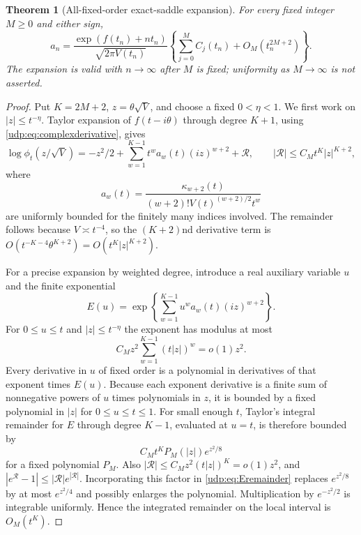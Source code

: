 \documentclass[11pt]{article}
\newtheorem{theorem}{Theorem}[section]
\theoremstyle{remark}\newtheorem{remark}[theorem]{Remark}
\numberwithin{equation}{section}
\begin{document}
\begin{theorem}[All-fixed-order exact-saddle expansion]\label{udp:thm:saddle}
For every fixed integer $M\ge0$ and either sign,
\begin{equation}\label{udp:eq:allsaddle}
 a_n=\frac{\exp(f(t_n)+nt_n)}{\sqrt{2\pi V(t_n)}}
 \left\{\sum_{j=0}^M C_j(t_n)+O_M(t_n^{2M+2})\right\}.
\end{equation}
The expansion is valid with $n\to\infty$ after $M$ is fixed; uniformity as $M\to\infty$ is not asserted.
\end{theorem}
\begin{proof}
Put $K=2M+2$, $z=\theta\sqrt V$, and choose a fixed $0<\eta<1$. We first work on $|z|\le t^{-\eta}$. Taylor expansion of $f(t-i\theta)$ through degree $K+1$, using \eqref{udp:eq:complexderivative}, gives
\begin{equation}\label{udp:eq:localexp}
 \log\phi_t(z/\sqrt V)
 =-z^2/2+\sum_{w=1}^{K-1}t^wa_w(t)(iz)^{w+2}+\mathcal R,
 \qquad |\mathcal R|\le C_Mt^K|z|^{K+2},
\end{equation}
where
\[
 a_w(t)=\frac{\kappa_{w+2}(t)}{(w+2)!V(t)^{(w+2)/2}t^w}
\]
are uniformly bounded for the finitely many indices involved. The remainder follows because $V\asymp t^{-4}$, so the $(K+2)$nd derivative term is $O(t^{-K-4}\theta^{K+2})=O(t^K|z|^{K+2})$.

For a precise expansion by weighted degree, introduce a real auxiliary variable $u$ and the finite exponential
\[
 E(u)=\exp\left\{\sum_{w=1}^{K-1}u^wa_w(t)(iz)^{w+2}\right\}.
\]
For $0\le u\le t$ and $|z|\le t^{-\eta}$ the exponent has modulus at most
\[
 C_Mz^2\sum_{w=1}^{K-1}(t|z|)^w=o(1)z^2.
\]
Every derivative in $u$ of fixed order is a polynomial in derivatives of that exponent times $E(u)$. Because each exponent derivative is a finite sum of nonnegative powers of $u$ times polynomials in $z$, it is bounded by a fixed polynomial in $|z|$ for $0\le u\le t\le1$. For small enough $t$, Taylor's integral remainder for $E$ through degree $K-1$, evaluated at $u=t$, is therefore bounded by
\begin{equation}\label{udp:eq:Eremainder}
 C_Mt^KP_M(|z|)e^{z^2/8}
\end{equation}
for a fixed polynomial $P_M$. Also $|\mathcal R|\le C_Mz^2(t|z|)^K=o(1)z^2$, and $|e^{\mathcal R}-1|\le|\mathcal R|e^{|\mathcal R|}$. Incorporating this factor in \eqref{udp:eq:Eremainder} replaces $e^{z^2/8}$ by at most $e^{z^2/4}$ and possibly enlarges the polynomial. Multiplication by $e^{-z^2/2}$ is integrable uniformly. Hence the integrated remainder on the local interval is $O_M(t^K)$.


\end{proof}
\end{document}
